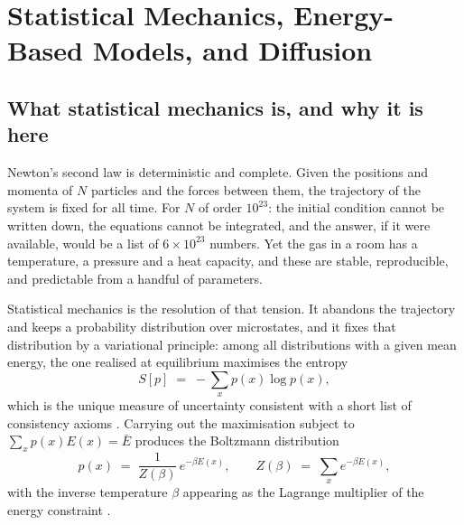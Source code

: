 %

\chapter{Statistical Mechanics, Energy-Based Models, and Diffusion}
\label{ch:statmech}

\section{What statistical mechanics is, and why it is here}
\label{sec:sm-what}

Newton's second law is deterministic and complete. Given the positions and
momenta of $N$ particles and the forces between them, the trajectory of the
system is fixed for all time. For $N$ of order $10^{23}$: the initial condition cannot be written down, the equations cannot be
integrated, and the answer, if it were available, would be a list of
$6 \times 10^{23}$ numbers. Yet the gas
in a room has a temperature, a pressure and a heat capacity, and these are
stable, reproducible, and predictable from a handful of parameters.

Statistical mechanics is the resolution of that tension. It abandons the
trajectory and keeps a probability distribution over microstates, and it fixes
that distribution by a variational principle: among all distributions with a
given mean energy, the one realised at equilibrium maximises the entropy
\begin{equation}
  S[p] \;=\; -\sum_{x} p(x) \log p(x),
  \label{eq:sm-entropy}
\end{equation}
which is the unique measure of uncertainty consistent with a short list of
consistency axioms \citep{jaynes1957information}. Carrying out the maximisation
subject to $\sum_x p(x) E(x) = \bar{E}$ produces the Boltzmann distribution
\begin{equation}
  p(x) \;=\; \frac{1}{Z(\beta)}\, e^{-\beta E(x)},
  \qquad
  Z(\beta) \;=\; \sum_{x} e^{-\beta E(x)},
  \label{eq:sm-boltzmann}
\end{equation}
with the inverse temperature $\beta$ appearing as the Lagrange multiplier of
the energy constraint \citep{landau1980statistical, goldstein2002classical}.

